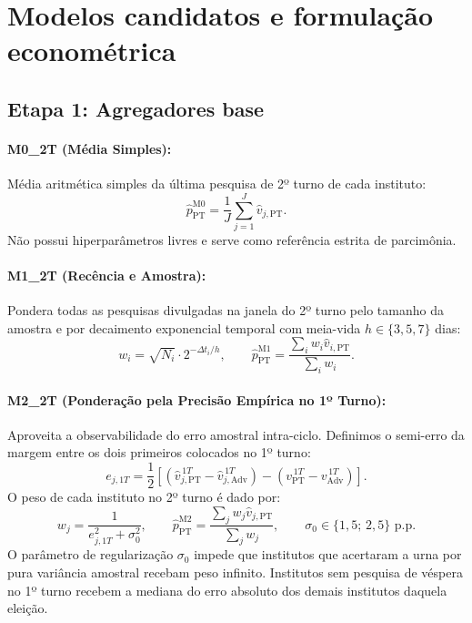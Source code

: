 \documentclass[10.5pt,a4paper]{article}
\begin{document}
\section{Modelos candidatos e formulação econométrica}

\subsection{Etapa 1: Agregadores base}

\paragraph{M0\_2T (Média Simples):}
Média aritmética simples da última pesquisa de 2º turno de cada instituto:
\begin{equation}
\hat{p}_{\text{PT}}^{\text{M0}} = \frac{1}{J} \sum_{j=1}^{J} \hat{v}_{j, \text{PT}}.
\end{equation}
Não possui hiperparâmetros livres e serve como referência estrita de parcimônia.

\paragraph{M1\_2T (Recência e Amostra):}
Pondera todas as pesquisas divulgadas na janela do 2º turno pelo tamanho da amostra e por decaimento exponencial temporal com meia-vida $h \in \{3, 5, 7\}$ dias:
\begin{equation}
w_i = \sqrt{N_i} \cdot 2^{-\Delta t_i / h}, \qquad \hat{p}_{\text{PT}}^{\text{M1}} = \frac{\sum_i w_i \hat{v}_{i, \text{PT}}}{\sum_i w_i}.
\end{equation}

\paragraph{M2\_2T (Ponderação pela Precisão Empírica no 1º Turno):}
Aproveita a observabilidade do erro amostral intra-ciclo. Definimos o semi-erro da margem entre os dois primeiros colocados no 1º turno:
\begin{equation}
e_{j, 1T} = \frac{1}{2}\left[ (\hat{v}_{j, \text{PT}}^{\,1T} - \hat{v}_{j, \text{Adv}}^{\,1T}) - (v_{\text{PT}}^{\,1T} - v_{\text{Adv}}^{\,1T}) \right].
\end{equation}
O peso de cada instituto no 2º turno é dado por:
\begin{equation}
w_j = \frac{1}{e_{j, 1T}^2 + \sigma_0^2}, \qquad \hat{p}_{\text{PT}}^{\text{M2}} = \frac{\sum_j w_j \hat{v}_{j, \text{PT}}}{\sum_j w_j}, \qquad \sigma_0 \in \{1{,}5; \, 2{,}5\}\text{ p.p.}
\end{equation}
O parâmetro de regularização $\sigma_0$ impede que institutos que acertaram a urna por pura variância amostral recebam peso infinito. Institutos sem pesquisa de véspera no 1º turno recebem a mediana do erro absoluto dos demais institutos daquela eleição.
\end{document}
